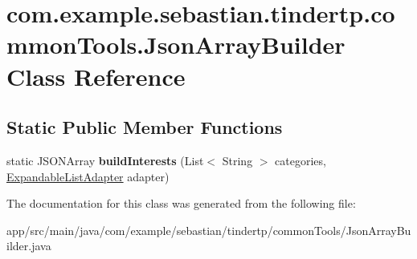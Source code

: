 \hypertarget{classcom_1_1example_1_1sebastian_1_1tindertp_1_1commonTools_1_1JsonArrayBuilder}{}\section{com.\+example.\+sebastian.\+tindertp.\+common\+Tools.\+Json\+Array\+Builder Class Reference}
\label{classcom_1_1example_1_1sebastian_1_1tindertp_1_1commonTools_1_1JsonArrayBuilder}
\subsection*{Static Public Member Functions}
\begin{DoxyCompactItemize}
\item 
static J\+S\+O\+N\+Array {\bfseries build\+Interests} (List$<$ String $>$ categories, \hyperlink{classcom_1_1example_1_1sebastian_1_1tindertp_1_1ExpandedListAdapters_1_1ExpandableListAdapter}{Expandable\+List\+Adapter} adapter)\hypertarget{classcom_1_1example_1_1sebastian_1_1tindertp_1_1commonTools_1_1JsonArrayBuilder_adb3b51598a1662b8189de3326457a237}{}\label{classcom_1_1example_1_1sebastian_1_1tindertp_1_1commonTools_1_1JsonArrayBuilder_adb3b51598a1662b8189de3326457a237}

\end{DoxyCompactItemize}


The documentation for this class was generated from the following file\+:\begin{DoxyCompactItemize}
\item 
app/src/main/java/com/example/sebastian/tindertp/common\+Tools/Json\+Array\+Builder.\+java\end{DoxyCompactItemize}
